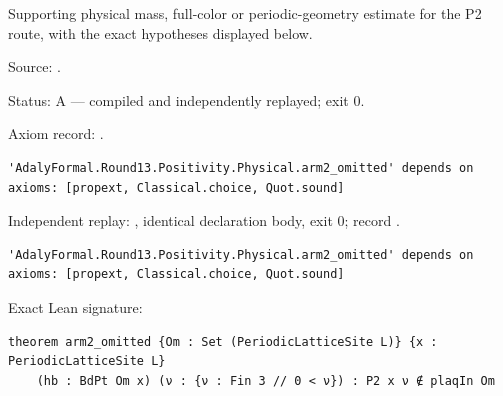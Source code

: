 \begin{theorem}[bp-487]
\label{bp-487}
\uses{}
\leanok
Supporting physical mass, full-color or periodic-geometry estimate for the P2 route, with the exact hypotheses displayed below.

\par Source: \texttt{}.
\par Status: A — compiled and independently replayed; exit 0.
\par Axiom record: \texttt{}.
\begin{verbatim}
'AdalyFormal.Round13.Positivity.Physical.arm2_omitted' depends on axioms: [propext, Classical.choice, Quot.sound]
\end{verbatim}
\par Independent replay: \texttt{}, identical declaration body, exit 0; record \texttt{}.
\begin{verbatim}
'AdalyFormal.Round13.Positivity.Physical.arm2_omitted' depends on axioms: [propext, Classical.choice, Quot.sound]
\end{verbatim}
\par Exact Lean signature:
\begin{verbatim}
theorem arm2_omitted {Om : Set (PeriodicLatticeSite L)} {x : PeriodicLatticeSite L}
    (hb : BdPt Om x) (ν : {ν : Fin 3 // 0 < ν}) : P2 x ν ∉ plaqIn Om
\end{verbatim}
\end{theorem}

